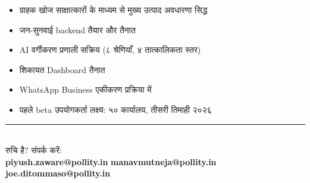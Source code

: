 \documentclass[11pt, a4paper]{article}
\begin{document}
\begin{tcolorbox}[colback=lightgray, colframe=pollityblue, sharp corners, boxrule=0.5pt]
\begin{itemize}[leftmargin=1.5em, itemsep=3pt, topsep=2pt]
  \item[$\checkmark$] ग्राहक खोज साक्षात्कारों के माध्यम से मुख्य उत्पाद अवधारणा सिद्ध
  \item[$\checkmark$] जन-सुनवाई \textenglish{backend} तैयार और तैनात
  \item[$\checkmark$] \textenglish{AI} वर्गीकरण प्रणाली सक्रिय (८ श्रेणियाँ, ४ तात्कालिकता स्तर)
  \item[$\checkmark$] शिकायत \textenglish{Dashboard} तैनात
  \item[$\rightarrow$] \textenglish{WhatsApp Business} एकीकरण प्रक्रिया में
  \item[$\rightarrow$] पहले \textenglish{beta} उपयोगकर्ता लक्ष्य: ५० कार्यालय, तीसरी तिमाही २०२६
\end{itemize}
\end{tcolorbox}

\vspace{1em}
\begin{center}
{\color{pollityblue}\rule{0.5\linewidth}{0.4pt}}\\[0.5em]
{\small रुचि है? संपर्क करें:}\\[0.3em]
{\small \textbf{\textenglish{piyush.zaware@pollity.in}} \textbar{} \textbf{\textenglish{manavmutneja@pollity.in}} \textbar{} \textbf{\textenglish{joe.ditommaso@pollity.in}}}
\end{center}
\end{document}
